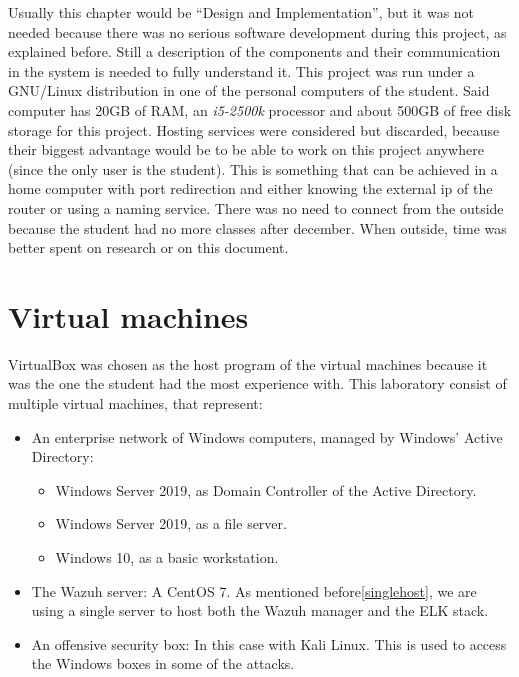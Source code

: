 Usually this chapter would be ``Design and Implementation'', but it was not needed because there was no serious software development during this project, as explained before.
Still a description of the components and their communication in the system is needed to fully understand it.
\linej
\linej
This project was run under a GNU/Linux distribution in one of the personal computers of the student.
Said computer has 20GB of RAM, an \textit{i5-2500k} processor and about 500GB of free disk storage for this project.
\linej
\linej
Hosting services were considered but discarded, because their biggest advantage would be to be able to work on this project anywhere (since the only user is the student). This is something that can be achieved in a home computer with port redirection and either knowing the external ip of the router or using a naming service. There was no need to connect from the outside because the student had no more classes after december. When outside, time was better spent on research or on this document.

\section{Virtual machines}
VirtualBox was chosen as the host program of the virtual machines because it was the one the student had the most experience with.
\linej
This laboratory consist of multiple virtual machines, that represent:
\begin{itemize}
	\item An enterprise network of Windows computers, managed by Windows' Active Directory:
		\begin{itemize}
			\item Windows Server 2019, as Domain Controller of the Active Directory.
			\item Windows Server 2019, as a file server.
			\item Windows 10, as a basic workstation.
		\end{itemize}
	\item The Wazuh server: A CentOS 7. As mentioned before\ref{singlehost}, we are using a single server to host both the Wazuh manager and the ELK stack.
	\item An offensive security box: In this case with Kali Linux. This is used to access the Windows boxes in some of the attacks.
\end{itemize}

